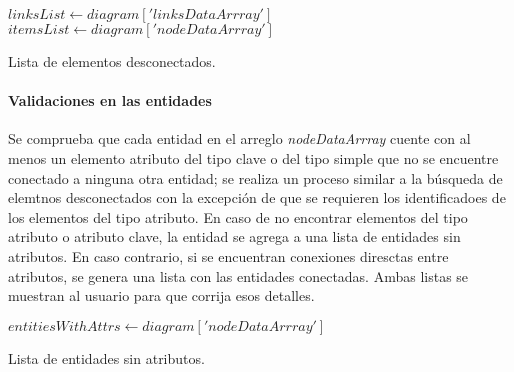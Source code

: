 \begin{algorithm}[H]

  $linksList \gets diagram['linksDataArrray']$\\
  $itemsList \gets diagram['nodeDataArrray']$\\
  
  \caption{Lista de elementos desconectados.}
\end{algorithm}


\paragraph*{Validaciones en las entidades}


Se comprueba que cada entidad en el arreglo \textit{nodeDataArrray} cuente con al menos un elemento atributo del tipo clave o del tipo simple que no se encuentre conectado a ninguna otra entidad; se realiza un proceso similar a la búsqueda de elemtnos desconectados con la excepción de que se requieren los identificadoes de los elementos del tipo atributo. En caso de no encontrar elementos del tipo atributo o atributo clave, la entidad se agrega a una lista de entidades sin atributos. En caso contrario, si se encuentran conexiones diresctas entre atributos, se genera una lista con las entidades conectadas. Ambas listas se muestran al usuario para que corrija esos detalles.

\begin{algorithm}[H]

  $entitiesWithAttrs \gets diagram['nodeDataArrray']$\\
  
  \caption{Lista de entidades sin atributos.}
\end{algorithm}

